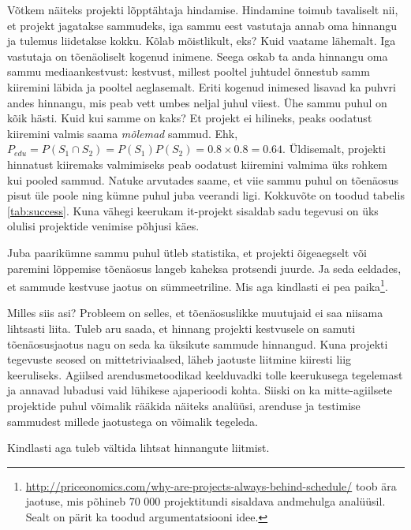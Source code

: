 \documentclass{tufte-book}
\begin{document}
Võtkem näiteks projekti lõpptähtaja hindamise. Hindamine toimub tavaliselt nii, et projekt jagatakse sammudeks, iga sammu eest vastutaja annab oma hinnangu ja tulemus liidetakse kokku. Kõlab mõistlikult, eks? Kuid vaatame lähemalt. Iga vastutaja on tõenäoliselt kogenud inimene. Seega oskab ta anda hinnangu oma sammu mediaankestvust: kestvust, millest pooltel juhtudel õnnestub samm kiiremini läbida ja pooltel aeglasemalt. Eriti kogenud inimesed lisavad ka puhvri andes hinnangu, mis peab vett umbes neljal juhul viiest. Ühe sammu puhul on kõik hästi. Kuid kui samme on kaks? Et projekt ei hilineks, peaks oodatust kiiremini valmis saama \emph{mõlemad} sammud. Ehk, $P_{edu}=P(S_1\cap S_2)=P(S_1)P(S_2)=0.8\times0.8=0.64$. Üldisemalt, projekti hinnatust kiiremaks valmimiseks peab oodatust kiiremini valmima üks rohkem kui pooled sammud. Natuke arvutades saame, et viie sammu puhul on tõenäosus pisut üle poole ning kümne puhul juba veerandi ligi. Kokkuvõte on toodud tabelis \ref{tab:success}. Kuna vähegi keerukam it-projekt sisaldab sadu tegevusi on üks olulisi projektide venimise põhjusi käes.

Juba paarikümne sammu puhul ütleb statistika, et projekti õigeaegselt või paremini lõppemise tõenäosus langeb kaheksa protsendi juurde. Ja seda eeldades, et sammude kestvuse jaotus on sümmeetriline. Mis aga kindlasti ei pea paika\footnote{\url{http://priceonomics.com/why-are-projects-always-behind-schedule/} toob ära jaotuse, mis põhineb 70 000 projektitundi sisaldava andmehulga analüüsil. Sealt on pärit ka toodud argumentatsiooni idee.}. 

Milles siis asi? Probleem on selles, et tõenäosuslikke muutujaid ei saa niisama lihtsasti liita. Tuleb aru saada, et hinnang projekti kestvusele on samuti tõenäosusjaotus nagu on seda ka üksikute sammude hinnangud. Kuna projekti tegevuste seosed on mittetriviaalsed, läheb jaotuste liitmine kiiresti liig keeruliseks. Agiilsed arendusmetoodikad keelduvadki tolle keerukusega tegelemast ja annavad lubadusi vaid lühikese ajaperioodi kohta. Siiski on ka mitte-agiilsete projektide puhul võimalik rääkida näiteks analüüsi, arenduse ja testimise sammudest millede jaotustega on võimalik tegeleda.  

Kindlasti aga tuleb vältida lihtsat hinnangute liitmist.
\end{document}
